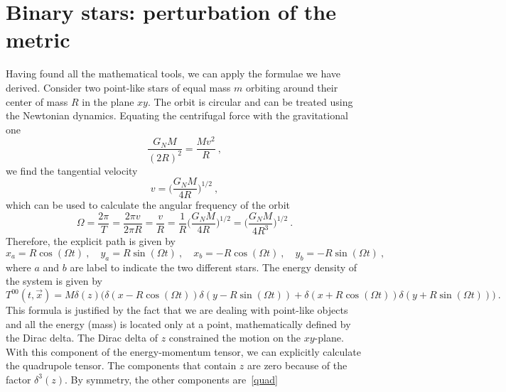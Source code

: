 \documentclass[a4paper]{article}
\begin{document}
\section{Binary stars: perturbation of the metric}

    Having found all the mathematical tools, we can apply the formulae we have derived. Consider two point-like stars of equal mass $m$ orbiting around their center of mass $R$ in the plane $xy$. The orbit is circular and can be treated using the Newtonian dynamics. Equating the centrifugal force with the gravitational one
    \begin{equation*}
        \frac{G_N M}{(2 R)^2} = \frac{M v^2}{R} ~, 
    \end{equation*}
    we find the tangential velocity
    \begin{equation*}
        v = \Big ( \frac{G_N M}{4 R} \Big)^{1/2} ~,
    \end{equation*}
    which can be used to calculate the angular frequency of the orbit
    \begin{equation}\label{freq}
        \Omega = \frac{2\pi}{T} = \frac{2 \pi v}{2 \pi R} = \frac{v}{R} = \frac{1}{R} \Big ( \frac{G_N M}{4 R} \Big)^{1/2} = \Big ( \frac{G_N M}{4 R^3} \Big)^{1/2} ~.
    \end{equation}
    Therefore, the explicit path is given by 
    \begin{equation}\label{traj}
        x_a = R \cos (\Omega t) ~, \quad y_a = R \sin (\Omega t) ~, \quad x_b = - R \cos (\Omega t) ~, \quad y_b = - R \sin (\Omega t) ~,
    \end{equation}
    where $a$ and $b$ are label to indicate the two different stars. The energy density of the system is given by 
    \begin{equation*}
        T^{00} (t, \vec x) = M \delta (z) \Big (\delta(x - R \cos (\Omega t))\delta(y - R \sin (\Omega t)) + \delta(x + R \cos (\Omega t))\delta(y + R \sin (\Omega t)) \Big) ~.
    \end{equation*}
    This formula is justified by the fact that we are dealing with point-like objects and all the energy (mass) is located only at a point, mathematically defined by the Dirac delta. The Dirac delta of $z$ constrained the motion on the $xy$-plane. With this component of the energy-momentum tensor, we can explicitly calculate the quadrupole tensor. The components that contain $z$ are zero because of the factor $\delta^3 (z)$. By symmetry, the other components are~\eqref{quad}
\end{document}

